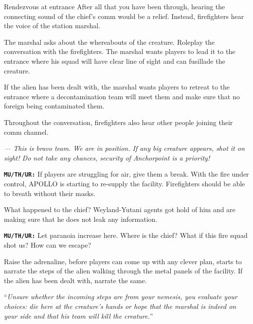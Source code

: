 \begin{rpg-commentbox}{Rendezvous at entrance}
   After all that you have been through, hearing the connecting sound of the chief's comm would be a relief. Instead, firefighters hear the voice of the station marshal.

   The marshal asks about the whereabouts of the creature. Roleplay the conversation with the firefighters. The marshal wants players to lead it to the entrance where his squad will have clear line of sight and can fusillade the creature. 

   If the alien has been dealt with, the marshal wants players to retreat to the entrance where a decontamination team will meet them and make sure that no foreign being contaminated them.  

   Throughout the conversation, firefighters also hear other people joining their comm channel. 

   \textit{--- This is bravo team. We are in position. If any big creature appears, shot it on sight! Do not take any chances, security of Anchorpoint is a priority!}

   \texttt{\textbf{MU/TH/UR:}} If players are struggling for air, give them a break. With the fire under control, APOLLO is starting to re-supply the facility. Firefighters should be able to breath without their masks. 
\end{rpg-commentbox} 

\begin{rpg-commentbox}{What happened to the chief?}
   Weyland-Yutani agents got hold of him and are making sure that he does not leak any information.

   \texttt{\textbf{MU/TH/UR:}} Let paranoia increase here. Where is the chief? What if this fire squad shot us? How can we escape?

   Raise the adrenaline, before players can come up with any clever plan, starts to narrate the steps of the alien walking through the metal panels of the facility. If the alien has been dealt with, narrate the same.

   ``\textit{Unsure whether the incoming steps are from your nemesis, you evaluate your choices: die here at the creature's hands or hope that the marshal is indeed on your side and that his team will kill the creature.}''
\end{rpg-commentbox}    